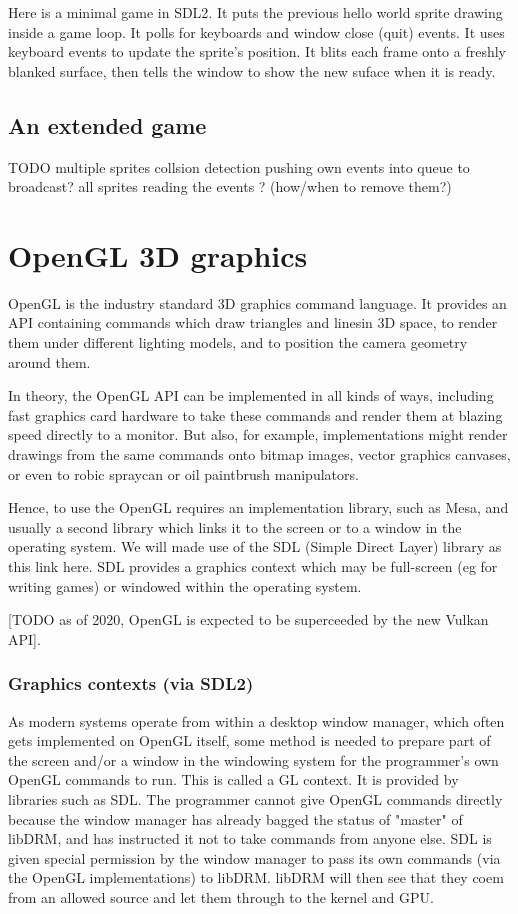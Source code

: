 \documentclass[oneside,english]{scrbook}
\begin{document}
Here is a minimal game in SDL2. It puts the previous hello world sprite drawing inside a game loop.  It polls for keyboards and window close (quit) events. It uses keyboard events to update the sprite's position. It blits each frame onto a freshly blanked surface, then tells the window to show the new suface when it is ready.




\section{An extended game}
TODO
multiple sprites
collsion detection
pushing own events into queue to broadcast?
all sprites reading the events ? (how/when to remove them?)

\chapter{OpenGL 3D graphics}

OpenGL is the industry standard 3D graphics command language.  It provides an API containing commands which draw triangles and linesin 3D space, to render them under different lighting models, and to position the camera geometry around them.

In theory, the OpenGL API can be implemented in all kinds of ways, including fast graphics card hardware to take these commands and render them at blazing speed directly to a monitor. But also, for example, implementations might render drawings from the same commands onto bitmap images, vector graphics canvases, or even to robic spraycan or oil paintbrush manipulators.

Hence, to use the OpenGL requires an implementation library, such as Mesa, and usually a second library which links it to the screen or to a window in the operating system.   We will made use of the SDL (Simple Direct Layer) library as this link here.   SDL provides a graphics context which may be full-screen (eg for writing games) or windowed within the operating system.   

[TODO as of 2020, OpenGL is expected to be superceeded by the new Vulkan API].


\subsection{Graphics contexts (via SDL2)}

As modern systems operate from within a desktop window manager, which often gets implemented on OpenGL itself, some method is needed to prepare part of the screen and/or a window in the windowing system for the programmer's own OpenGL commands to run.  This is called a GL context.  It is provided by libraries such as SDL.   The programmer cannot give OpenGL commands directly because the window manager has already bagged the status of "master" of libDRM, and has instructed it not to take commands from anyone else.  SDL is given special permission by the window manager to pass its own commands (via the OpenGL implementations) to libDRM.  libDRM will then see that they coem from an allowed source and let them through to the kernel and GPU.
\end{document}
